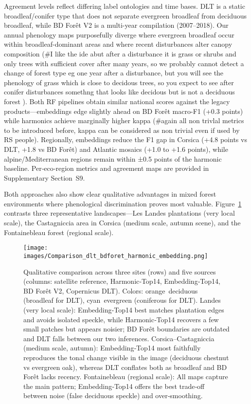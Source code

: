 \documentclass[utf8]{FrontiersinHarvard}
\begin{document}
Agreement levels reflect differing label ontologies and time bases. DLT is a static broadleaf/conifer type that does not separate evergreen broadleaf from deciduous broadleaf, while BD Forêt V2 is a multi-year compilation (2007–2018). Our annual phenology maps purposefully diverge where evergreen broadleaf occur within broadleaf-dominant areas and where recent disturbances alter canopy composition (#I like the ide abut after a disturbance it is grass or shrubs and only trees with sufficient cover after many years, so we probably cannot detect a change of forest type eg one year after a disturbance, but you will see the phenology of grass which is close to decidous trees, so you expect to see after conifer disturbances somethng that looks like decidous but is not a deciduous forest ). Both RF pipelines obtain similar national scores against the legacy products—embeddings edge slightly ahead on BD Forêt macro-F1 (+0.3 points) while harmonics achieve marginally higher kappa (#again all non trivlal metrics to be introduced before, kappa can be considered as non trivial even if used by RS people). Regionally, embeddings reduce the F1 gap in Corsica (+4.8 points vs DLT, +1.8 vs BD Forêt) and Atlantic mosaics (+1.0 to +1.6 points), while alpine/Mediterranean regions remain within ±0.5 points of the harmonic baseline. Per‑eco‑region metrics and agreement maps are provided in Supplementary Section~S9.

Both approaches also show clear qualitative advantages in mixed forest environments where phenological discrimination proves most valuable. Figure~\ref{fig:comparison_products} contrasts three representative landscapes—Les Landes plantations (very local scale), the Castagniccia area in Corsica (medium scale, autumn scene), and the Fontainebleau forest (regional scale).

\begin{figure}[H]
    \centering
    \texttt{[image: images/Comparison\_dlt\_bdforet\_harmonic\_embedding.png]}
    \caption{Qualitative comparison across three sites (rows) and five sources (columns: satellite reference, Harmonic‑Top14, Embedding‑Top14, BD Forêt V2, Copernicus DLT). Colors: orange~deciduous (broadleaf for DLT), cyan~evergreen (coniferous for DLT).\newline
    Landes (very local scale): Embedding‑Top14 best matches plantation edges and avoids isolated speckle, while Harmonic‑Top14 recovers a few small patches but appears noisier; BD Forêt boundaries are outdated and DLT falls between our two inferences.\newline
    Corsica–Castagniccia (medium scale, autumn): Embedding‑Top14 most faithfully reproduces the tonal change visible in the image (deciduous chestnut vs evergreen oak), whereas DLT conflates both as broadleaf and BD Forêt lacks recency.\newline
    Fontainebleau (regional scale): All maps capture the main pattern; Embedding‑Top14 offers the best trade‑off between noise (false deciduous speckle) and over‑smoothing.}
    \label{fig:comparison_products}
\end{figure}
\end{document}
